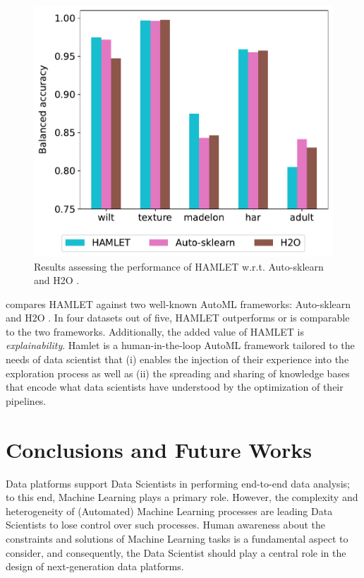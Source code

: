 \begin{figure}[t]
    \centering
    \includegraphics[scale=.45]{chapters/human-centric/hamlet/img/comparison.pdf}
    \caption{Results assessing the performance of HAMLET w.r.t. Auto-sklearn \cite{feurer2019auto} and H2O \cite{ledell2020h2o}.}
    \label{hamlet-fig:comparison}
\end{figure}


 compares HAMLET against two well-known AutoML frameworks: Auto-sklearn \cite{feurer2019auto} and H2O \cite{ledell2020h2o}.
In four datasets out of five, HAMLET outperforms or is comparable to the two frameworks.
Additionally, the added value of HAMLET is \textit{explainability}.
Hamlet is a human-in-the-loop AutoML framework tailored to the needs of data scientist that (i) enables the injection of their experience into the exploration process as well as (ii) the spreading and sharing of knowledge bases that encode what data scientists have understood by the optimization of their pipelines.


\section{Conclusions and Future Works}\label{hamlet-sec:conclusion}

Data platforms support Data Scientists in performing end-to-end data analysis; to this end, Machine Learning plays a primary role.
However, the complexity and heterogeneity of (Automated) Machine Learning processes are leading Data Scientists to lose control over such processes.
Human awareness about the constraints and solutions of Machine Learning tasks is a fundamental aspect to consider, and consequently, the Data Scientist should play a central role in the design of next-generation data platforms.

